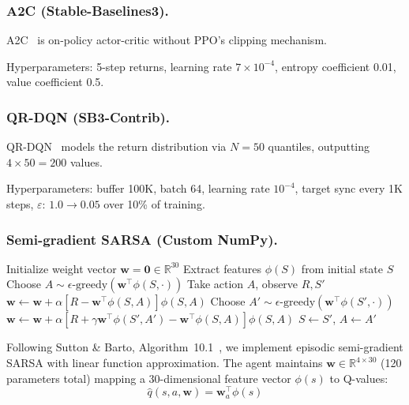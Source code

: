 \documentclass[letterpaper]{article}
\begin{document}
\subsubsection{A2C (Stable-Baselines3).}

A2C~\cite{mnih2016asynchronous} is on-policy actor-critic without PPO's clipping mechanism.

Hyperparameters: 5-step returns, learning rate $7{\times}10^{-4}$, entropy coefficient 0.01, value coefficient 0.5.

\subsubsection{QR-DQN (SB3-Contrib).}

QR-DQN~\cite{dabney2018distributional} models the return distribution via $N{=}50$ quantiles, outputting $4{\times}50{=}200$ values.

Hyperparameters: buffer 100K, batch 64, learning rate $10^{-4}$, target sync every 1K steps, $\varepsilon$: $1.0 \to 0.05$ over 10\% of training.

\subsubsection{Semi-gradient SARSA (Custom NumPy).}

\begin{algorithm}[htbp]
\caption{Semi-gradient SARSA with Linear FA}
\label{alg:sarsa}
\begin{algorithmic}[1]
\State Initialize weight vector $\mathbf{w} = \mathbf{0} \in \mathbb{R}^{30}$
    \State Extract features $\phi(S)$ from initial state $S$
    \State Choose $A \sim \epsilon\text{-greedy}(\mathbf{w}^\top \phi(S, \cdot))$
    \Repeat
        \State Take action $A$, observe $R, S'$
            \State $\mathbf{w} \leftarrow \mathbf{w} + \alpha [R - \mathbf{w}^\top \phi(S, A)] \phi(S, A)$
        \Else
            \State Choose $A' \sim \epsilon\text{-greedy}(\mathbf{w}^\top \phi(S', \cdot))$
            \State $\mathbf{w} \leftarrow \mathbf{w} + \alpha [R + \gamma \mathbf{w}^\top \phi(S', A') - \mathbf{w}^\top \phi(S, A)] \phi(S, A)$
            \State $S \leftarrow S'$, $A \leftarrow A'$
        \EndIf
\EndFor
\end{algorithmic}
\end{algorithm}

Following Sutton \& Barto, Algorithm~10.1~\cite{sutton2018rl}, we implement episodic semi-gradient SARSA with linear function approximation. The agent maintains $\mathbf{w} \in \mathbb{R}^{4\times30}$ (120 parameters total) mapping a 30-dimensional feature vector $\phi(s)$ to Q-values:
\begin{equation}
    \hat{q}(s,a,\mathbf{w}) = \mathbf{w}_a^\top \phi(s)
\end{equation}
\end{document}
